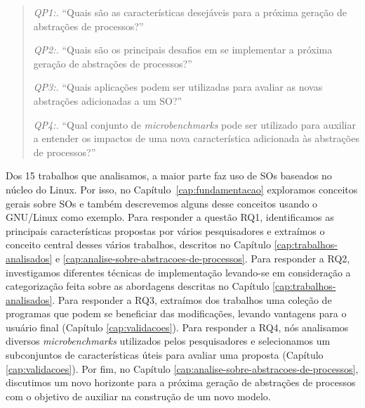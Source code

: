 \begin{quote}
 \item \textit{QP1:.} ``Quais são as características desejáveis para a próxima geração de abstrações de processos?''
 \item \textit{QP2:.} ``Quais são os principais desafios em se implementar a próxima geração de abstrações de processos?''
 \item \textit{QP3:.} ``Quais aplicações podem ser utilizadas para avaliar as novas abstrações adicionadas a um SO?''
 \item \textit{QP4:.} ``Qual conjunto de \emph{microbenchmarks} pode ser utilizado para auxiliar a entender os impactos de uma nova característica adicionada às abstrações de processos?''
\end{quote}

Dos 15 trabalhos que analisamos, a maior parte faz uso de SOs baseados no
núcleo do Linux. Por isso, no Capítulo~\ref{cap:fundamentacao} exploramos
conceitos gerais sobre SOs e também descrevemos alguns desse conceitos usando o
GNU/Linux como exemplo. Para responder a questão RQ1, identificamos as
principais características propostas por vários pesquisadores e extraímos o
conceito central desses vários trabalhos, descritos no Capítulo
\ref{cap:trabalhos-analisados} e
\ref{cap:analise-sobre-abstracoes-de-processos}. Para responder a RQ2,
investigamos diferentes técnicas de implementação levando-se em consideração a
categorização feita sobre as abordagens descritas no Capítulo
\ref{cap:trabalhos-analisados}. Para responder a RQ3, extraímos dos trabalhos
uma coleção de programas que podem se beneficiar das modificações, levando
vantagens para o usuário final (Capítulo \ref{cap:validacoes}). Para responder
a RQ4, nós analisamos diversos \emph{microbenchmarks} utilizados pelos
pesquisadores e selecionamos um subconjuntos de características úteis para
avaliar uma proposta (Capítulo \ref{cap:validacoes}). Por fim, no Capítulo
\ref{cap:analise-sobre-abstracoes-de-processos}, discutimos um novo horizonte
para a próxima geração de abstrações de processos com o objetivo de auxiliar na
construção de um novo modelo.
